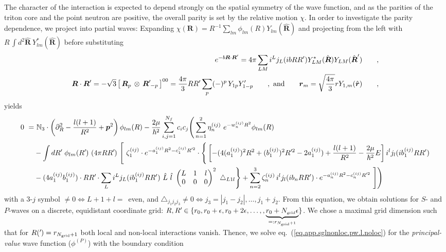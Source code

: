 \documentclass[aps,onecolumn,preprintnumbers,amsmath,amssymb,nofootinbib,superscriptaddress,notitlepage]{revtex4-1}
\newcommand{\eref}[1]{eq.~(\ref{#1})}
\newcommand{\ve}[1]{\ensuremath{\boldsymbol{#1}}}
\newcommand*{\mprime}{^{\prime}\mkern-1.2mu}
\newcommand{\twomhbs}{\ensuremath \frac{2\mu}{\hbar^2}}
\newcommand{\coup}[3]{\left[\,#1\,\otimes\,#2\,\right]^{#3}}
\newcommand{\threej}[6]{ \begin{pmatrix}
   #1 & #2 & #3 \\
   #4 & #5 & #6 
  \end{pmatrix}}
\begin{document}
The character of the interaction is expected to depend strongly on the spatial symmetry of the wave function, and as
the parities of the triton core and the point neutron are positive, the overall parity is set by the relative motion
$\chi$. In order to investigate the parity dependence, we project into partial waves:
Expanding $\chi(\ve{R})=R^{-1}\sum_{lm}\phi_{lm}(R)Y_{lm}(\hat{\ve{R}})$
and projecting from the left with
$R\,\int d^2\hat{\ve{R}}~Y^*_{lm}(\hat{\ve{R}})$
before substituting
\begin{eqnarray}
e^{-b\ve{R}\cdot\ve{R}'}=4\pi\sum_{LM}i^Lj_L(ib RR')Y^*_{LM}(\hat{\ve{R}})Y_{LM}(\hat{\ve{R}}')\qquad,\\
\ve{R}\cdot\ve{R}'=-\sqrt{3}\coup{\ve{R}_p}{\ve{R}\mprime_{-p}}{00}=\frac{4\pi}{3}RR'\sum_p(-)^p\,Y_{1p}Y'_{1-p}\qquad,
~\text{and}\qquad\ve{r}_m=\sqrt{\frac{4\pi}{3}}rY_{1,m}(\hat{\ve{r}})\qquad,\\
\end{eqnarray}
yields
\begin{align}
0~=&
~\mathbb{N}_3\cdot\left(\partial^2_R-\frac{l(l+1)}{R^2}+\ve{p}^2\right)
\phi_{lm}(R)
-
\twomhbs\sum_{i,j=1}^{N_f}c_ic_j\Bigg(
\sum_{n=1}^2\eta^{(ij)}_n~e^{-w^{(ij)}_nR^2}\phi_{lm}(R)\nonumber\\
%
&-\int dR\mprime~\phi_{lm}(R\mprime)~(4\pi RR\mprime )~\Bigg[
%
~\zeta^{(ij)}_1 \cdot e^{-a^{(ij)}_1R^2-c^{(ij)}_1R'^2}\cdot\Bigg\lbrace
\left[-(4(a^{(ij)}_1)^2R^2+(b^{(ij)}_1)^2R\mprime^2-2a^{(ij)}_1)+\frac{l(l+1)}{R^2}-\frac{2\mu}{\hbar^2}E\right]
 i^l j_{l}(ib^{(ij)}_1 RR')\nonumber\\
%
&-(4a^{(ij)}_1b^{(ij)}_1)\cdot RR\mprime\cdot
\sum_Li^Lj_L(ib^{(ij)}_1 RR')~\hat{L}~\hat{l}~\threej{L}{1}{l}{0}{0}{0}^2~\triangle_{L1l}\Bigg\rbrace
%
+\sum_{n=2}^3\zeta^{(ij)}_n\,i^l j_l(ib_n RR')\cdot 
e^{-a^{(ij)}_nR^2-c^{(ij)}_nR'^2}~\Bigg]\Bigg)\label{eq.app.sglnonloc.pw.l.noloc}
\end{align}
with a 3-$j$ symbol $\neq0\Leftrightarrow L+1+l=$~even, and $\triangle_{j_1j_2j_3}\neq0\Leftrightarrow j_3=|j_1-j_2|,\ldots,j_1+j_2$.
From this equation, we obtain solutions for $S$- and $P$-waves on a discrete, equidistant coordinate grid:
$R,R\mprime\in\lbrace r_0,r_0+\epsilon,r_0+2\epsilon,\ldots,,\underbrace{r_0+N_\text{\tiny grid}\epsilon}_{=:r_{N_\text{\tiny grid}+1}}\rbrace$.
We chose a maximal grid dimension such that for $R(\mprime)=r_{N_\text{\tiny grid}+1}$ both local and non-local interactions
vanish. Thence, we solve \eref{eq.app.sglnonloc.pw.l.noloc} for the {\it principal-value} wave function ($\phi^{(P)}$)
with the boundary condition
\end{document}
